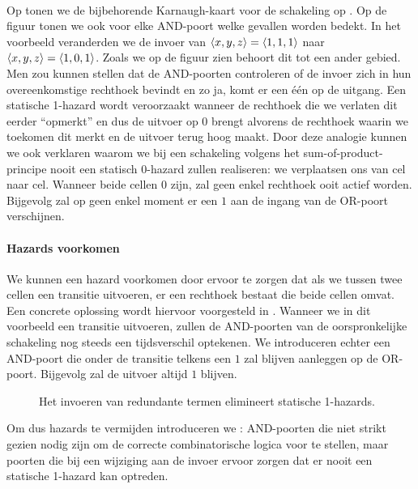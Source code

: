 \paragraph{}
Op  tonen we de bijbehorende Karnaugh-kaart voor de schakeling op . Op de figuur tonen we ook voor elke AND-poort welke gevallen worden bedekt. In het voorbeeld veranderden we de invoer van $\left\langle x,y,z \right\rangle=\left\langle 1,1,1 \right\rangle$ naar $\left\langle x,y,z \right\rangle=\left\langle 1,0,1 \right\rangle$. Zoals we op de figuur zien behoort dit tot een ander gebied. Men zou kunnen stellen dat de AND-poorten controleren of de invoer zich in hun overeenkomstige rechthoek bevindt en zo ja, komt er een \'e\'en op de uitgang. Een statische 1-hazard wordt veroorzaakt wanneer de rechthoek die we verlaten dit eerder ``opmerkt'' en dus de uitvoer op $0$ brengt alvorens de rechthoek waarin we toekomen dit merkt en de uitvoer terug hoog maakt. Door deze analogie kunnen we ook verklaren waarom we bij een schakeling volgens het sum-of-product-principe nooit een statisch 0-hazard zullen realiseren: we verplaatsen ons van cel naar cel. Wanneer beide cellen $0$ zijn, zal geen enkel rechthoek ooit actief worden. Bijgevolg zal op geen enkel moment er een $1$ aan de ingang van de OR-poort verschijnen.
\paragraph{Hazards voorkomen}
We kunnen een hazard voorkomen door ervoor te zorgen dat als we tussen twee cellen een transitie uitvoeren, er een rechthoek bestaat die beide cellen omvat. Een concrete oplossing wordt hiervoor voorgesteld in . Wanneer we in dit voorbeeld een transitie uitvoeren, zullen de AND-poorten van de oorspronkelijke schakeling nog steeds een tijdsverschil optekenen. We introduceren echter een AND-poort die onder de transitie telkens een $1$ zal blijven aanleggen op de OR-poort. Bijgevolg zal de uitvoer altijd $1$ blijven.
\begin{figure}[hbt]
\centering
{}
\caption{Het invoeren van redundante termen elimineert statische 1-hazards.}
\end{figure}
Om dus hazards te vermijden introduceren we : AND-poorten die niet strikt gezien nodig zijn om de correcte combinatorische logica voor te stellen, maar poorten die bij een wijziging aan de invoer ervoor zorgen dat er nooit een statische 1-hazard kan optreden.
